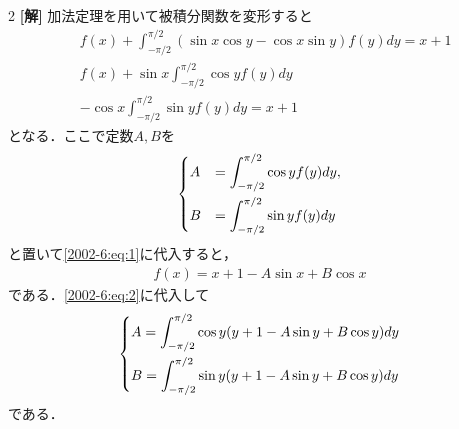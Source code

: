 \documentclass[../../../../main.tex]{subfiles}
\begin{document}
\setcounter{equation}{0}
\begin{oframed}
    
\end{oframed}
\setlength{\columnseprule}{0.4pt}
\begin{multicols}{2}
    {\bf[解]}
    加法定理を用いて被積分関数を変形すると
    \begin{align}
         & f(x) + \int_{-\pi/2}^{\pi/2} (\sin x \cos y - \cos x \sin y) f(y) dy = x+1 \nonumber \\
         & f(x) + \sin x \int_{-\pi/2}^{\pi/2} \cos y f(y) dy           \nonumber               \\
         & - \cos x \int_{-\pi/2}^{\pi/2} \sin y f(y) dy = x+1 \label{2002-6:eq:1}
    \end{align}
    となる．ここで定数$A,B$を
    \begin{align}
        \begin{dcases}
            A & = \int_{-\pi/2}^{\pi/2} \cos y f(y) dy, \\
            B & = \int_{-\pi/2}^{\pi/2} \sin y f(y) dy
        \end{dcases} \label{2002-6:eq:2}
    \end{align}
    と置いて\cref{2002-6:eq:1}に代入すると，
    \begin{align*}
        f(x) = x+1 - A\sin x + B\cos x
    \end{align*}
    である．\cref{2002-6:eq:2}に代入して
    \begin{align}
        \begin{dcases}
            A = \int_{-\pi/2}^{\pi/2} \cos y (y+1-A\sin y+B\cos y) dy \\
            B = \int_{-\pi/2}^{\pi/2} \sin y (y+1-A\sin y+B\cos y) dy
        \end{dcases}\label{2002-6:eq:3}
    \end{align}
    である．


\end{multicols}
\end{document}
